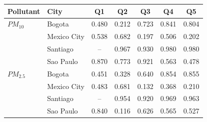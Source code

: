 \begin{tabular}{llccccc}
\toprule
Pollutant & City & Q1 & Q2 & Q3 & Q4 & Q5 \\
\midrule
$PM_{10}$ & Bogota & 0.480 & 0.212 & 0.723 & 0.841 & 0.804 \\
 & Mexico City & 0.538 & 0.682 & 0.197 & 0.506 & 0.202 \\
 & Santiago & -- & 0.967 & 0.930 & 0.980 & 0.980 \\
 & Sao Paulo & 0.870 & 0.773 & 0.921 & 0.563 & 0.478 \\
\addlinespace
$PM_{2.5}$ & Bogota & 0.451 & 0.328 & 0.640 & 0.854 & 0.855 \\
 & Mexico City & 0.483 & 0.681 & 0.132 & 0.368 & 0.210 \\
 & Santiago & -- & 0.954 & 0.920 & 0.969 & 0.963 \\
 & Sao Paulo & 0.840 & 0.116 & 0.626 & 0.565 & 0.527 \\
\bottomrule
\end{tabular}
